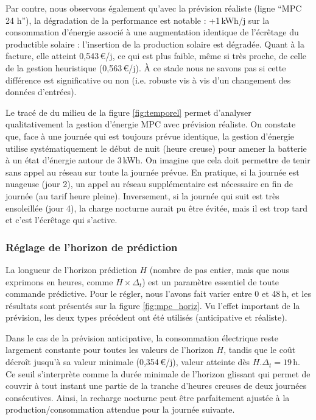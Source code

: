 \documentclass[a4paper,10pt,twocolumn]{article}
\begin{document}
Par contre, nous observons également qu'avec la prévision réaliste (ligne ``MPC 24 h''),
la dégradation de la performance est notable : +1\,kWh/j sur la consommation d'énergie
associé à une augmentation identique de l'écrêtage du productible solaire :
l'insertion de la production solaire est dégradée.
Quant à la facture, elle atteint 0,543\,€/j, ce qui est plus faible,
même si très proche, de celle de la gestion heuristique (0,563\,€/j).
À ce stade nous ne savons pas si cette différence est significative ou non
(i.e. robuste vis à vis d'un changement des données d'entrées).

Le tracé de du milieu de la figure \ref{fig:temporel} permet d'analyser qualitativement
la gestion d'énergie MPC avec prévision réaliste.
On constate que, face à une journée qui est toujours prévue identique, 
la gestion d'énergie utilise systématiquement le début de nuit (heure creuse) pour amener la batterie
à un état d'énergie autour de 3\,kWh.
On imagine que cela doit permettre de tenir sans appel au réseau sur toute la journée prévue.
En pratique, si la journée est nuageuse (jour 2), un appel au réseau supplémentaire
est nécessaire en fin de journée (au tarif heure pleine).
Inversement, si la journée qui suit est très ensoleillée (jour 4),
la charge nocturne aurait pu être évitée, mais il est trop tard
et c'est l'écrêtage qui s'active.

\subsubsection{Réglage de l'horizon de prédiction}
La longueur de l'horizon prédiction $H$ (nombre de pas entier,
mais que nous exprimons en heures, comme $H \times \Delta_t$)
est un paramètre essentiel de toute commande prédictive.
Pour le régler, nous l'avons fait varier entre 0 et 48\,h,
et les résultats sont présentés sur la figure \ref{fig:mpc_horiz}.
Vu l'effet important de la prévision, les deux types précédent
ont été utilisés (anticipative et réaliste).

Dans le cas de la prévision anticipative, la consommation électrique
reste largement constante pour toutes les valeurs de l'horizon $H$,
tandis que le coût décroît jusqu'à sa valeur minimale (0,354\,€/j),
valeur atteinte dès $H.\Delta_t = 19$\,h.
Ce seuil s'interprète comme la durée minimale de l'horizon glissant qui permet de couvrir
à tout instant une partie de la tranche d'heures creuses de deux journées consécutives.
Ainsi, la recharge nocturne peut être parfaitement ajustée à la production/consommation
attendue pour la journée suivante.
\end{document}

